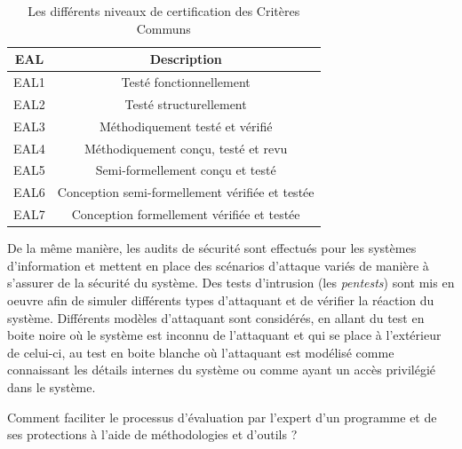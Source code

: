         \begin{table}
        {\small
            \begin{center}
\begin{tabular}{cc}
\hline
EAL  & Description                                     \\ \hline
EAL1 & Testé fonctionnellement                         \\
EAL2 & Testé structurellement                          \\
EAL3 & Méthodiquement testé et vérifié                 \\
EAL4 & Méthodiquement conçu, testé et revu             \\
EAL5 & Semi-formellement conçu et testé                \\
EAL6 & Conception semi-formellement vérifiée et testée \\
EAL7 & Conception formellement vérifiée et testée      \\ \hline
\end{tabular}
            \end{center}
            }
                \caption{Les différents niveaux de certification des Critères Communs \cite{Dureuil/Phd16}}
                \label{tbl:common-criterias-levels}
\end{table}

        De la même manière, les audits de sécurité sont effectués pour les systèmes d'information et mettent en place des scénarios d'attaque variés de manière à s'assurer de la sécurité du système. Des tests d'intrusion (les \textit{pentests}) sont mis en oeuvre afin de simuler différents types d'attaquant et de vérifier la réaction du système.  
        Différents modèles d'attaquant sont considérés, en allant du test en boite noire où le système est inconnu de l'attaquant et qui se place à l'extérieur de celui-ci, au test en boite blanche où l'attaquant est modélisé comme connaissant les détails internes du système ou comme ayant un accès privilégié dans le système. 
        
        \begin{probl}
        \label{prob:help-auditor}
            Comment faciliter le processus d'évaluation par l'expert d'un programme et de ses protections à l'aide de méthodologies et d'outils ?
        \end{probl}
        
